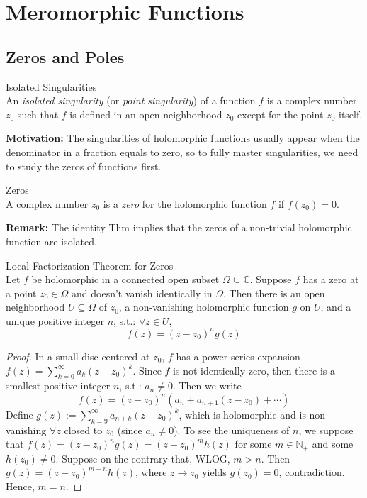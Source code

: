 \chapter{Meromorphic Functions}

\section{Zeros and Poles}

\begin{definition}{Isolated Singularities}\\
An \textit{isolated singularity} (or \textit{point singularity}) of a function $f$ is a complex number $z_0$ such that $f$ is defined in an open neighborhood $z_0$ except for the point $z_0$ itself.
\end{definition}

\noindent\textbf{Motivation:} The singularities of holomorphic functions usually appear when the denominator in a fraction equals to zero, so to fully master singularities, we need to study the zeros of functions first.

\begin{definition}{Zeros}\\
A complex number $z_0$ is a \textit{zero} for the holomorphic function $f$ if $f(z_0)=0$.
\end{definition}

\noindent\textbf{Remark:} The identity Thm implies that the zeros of a non-trivial holomorphic function are isolated.

\begin{theorem}{Local Factorization Theorem for Zeros}\\
Let $f$ be holomorphic in a connected open subset $\Omega \subseteq \mathbb{C}$. Suppose $f$ has a zero at a point $z_0 \in \Omega$ and doesn't vanish identically in $\Omega$. Then there is an open neighborhood $U\subseteq \Omega$ of $z_0$, a non-vanishing holomorphic function $g$ on $U$, and a unique positive integer $n$, s.t.: $\forall z\in U$,
\[
f(z)= (z-z_0)^n g(z)
\]
\end{theorem}

\begin{proof}
    In a small disc centered at $z_0$, $f$ has a power series expansion $f(z)= \sum_{k=0}^\infty a_k(z-z_0)^k$. Since $f$ is not identically zero, then there is a smallest positive integer $n$, s.t.: $a_n\neq 0$. Then we write
    \[
    f(z)=(z-z_0)^n (a_n+ a_{n+1}(z-z_0)+ \cdots)
    \]
    Define $g(z):= \sum_{k=9}^\infty a_{n+k} (z-z_0)^k$, which is holomorphic and is non-vanishing $\forall z$ closed to $z_0$ (since $a_n \neq 0$). To see the uniqueness of $n$, we suppose that $f(z)= (z-z_0)^n g(z)= (z-z_0)^m h(z)$ for some $m\in \mathbb{N}_+$ and some $h(z_0) \neq 0$. Suppose on the contrary that, WLOG, $m>n$. Then $g(z)= (z-z_0)^{m-n} h(z)$, where $z\to z_0$ yields $g(z_0)=0$, contradiction. Hence, $m=n$.
\end{proof}

